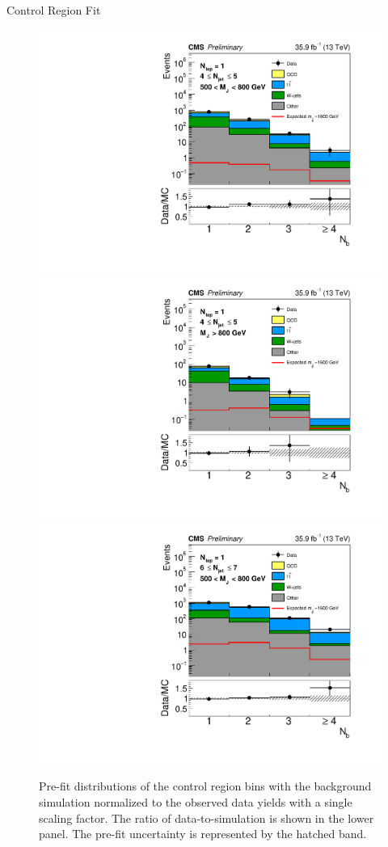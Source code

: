 \begin{section}{Control Region Fit}
\begin{figure}[tbp!]
\begin{center}
\includegraphics[angle=0,width=0.45\columnwidth]{fig/prefit_nlep1_nj45_lowmj.pdf}
\includegraphics[angle=0,width=0.45\columnwidth]{fig/prefit_nlep1_nj45_highmj.pdf}
\includegraphics[angle=0,width=0.45\columnwidth]{fig/prefit_nlep1_nj67_lowmj.pdf}
\end{center}
\caption{Pre-fit \Nb distributions of the control region bins with the background simulation normalized to the observed data yields with a single scaling factor.
The ratio of data-to-simulation is shown in the lower panel.
The pre-fit uncertainty is represented by the hatched band.}
\label{fig:prefit_cr}
\end{figure}

\end{section}

